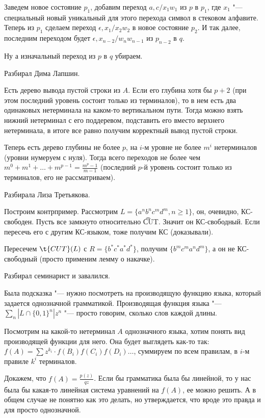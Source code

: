 Заведем новое состояние $p_1$, добавим переход $a, c/x_1w_1$ из $p$ в $p_1$, где $x_1$ "--- специальный новый уникальный для этого перехода символ в стековом алфавите.
Теперь из $p_1$ сделаем переход $\epsilon, x_1/x_2w_2$ в новое состояние $p_2$. И так далее, последним переходом будет $\epsilon, x_{n-2}/w_n w_{n-1}$ из $p_{n-2}$ в $q$.

Ну а изначальный переход из $p$ в $q$ убираем.

Разбирал Дима Лапшин.

Есть дерево вывода пустой строки из $A$. Если его глубина хотя бы $p + 2$ (при этом последний уровень состоит только из терминалов), то в нем есть два одинаковых нетерминала на каком-то вертикальном пути. 
Тогда можно взять нижний нетерминал с его поддеревом, подставить его вместо верхнего нетерминала, в итоге все равно получим корректный вывод пустой строки.

Теперь есть дерево глубины не более $p$, на $i$-м уровне не более $m^i$ нетерминалов (уровни нумеруем с нуля). 
Тогда всего переходов не более чем $m^0 + m^1 + \dots + m^{p-1} = \frac{m^p - 1}{m - 1}$ (последний $p$-й уровень состоит только из терминалов, его не рассматриваем).

Разбирала Лиза Третьякова.

Построим контрпример. Рассмотрим $L = \{a^n b^n c^m d^m, n \geq 1\}$, он, очевидно, КС-свободен. Пусть все замкнуто относительно \t{CUT}. 
Значит он КС-свободный. Если пересечь его с другим КС-языком, тоже получим КС (доказывали).

Пересечем $\t{CUT}(L)$ с $R = \{b^* c^* a^* d^*\}$, получим $\{b^m c^m a^n d^m\}$, а он не КС-свободный (просто применим лемму о накачке).

Разбирал семинарист и завалился.

Была подсказка "--- нужно посмотреть на производящую функцию языка, который задается однозначной грамматикой.
Производящая функция языка "--- $\sum \limits_n | L \cap \{0, 1\}^n | z^n$ "--- просто говорим, сколько слов каждой длины.

Посмотрим на какой-то нетерминал $A$ однозначного языка, хотим понять вид производящей функции для него.
Она будет выглядеть как-то так: $f(A) = \sum z^{k_i} \cdot f(B_i) f(C_i) f(D_i) \dots$, суммируем по всем правилам, в $i$-м правиле $k^i$ терминалов.

Докажем, что $f(A) = \frac{p(z)}{q{z}}$. Если бы грамматика была бы линейной, то у нас была бы какая-то линейная система уравнений на $f(A)$, ее можно решить.
А в общем случае не понятно как это делать, но утверждается, что вроде это правда и для просто однозначной.


